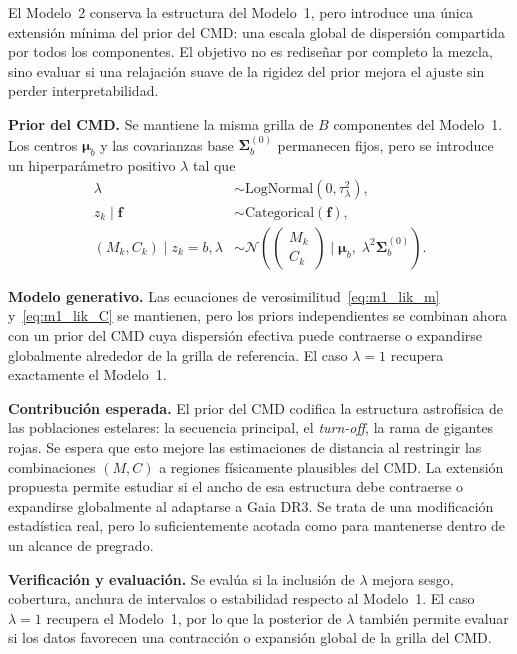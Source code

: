 \documentclass[stu, 12pt, letterpaper, donotrepeattitle, floatsintext, natbib]{apa7_ula}
\begin{document}
El Modelo~2 conserva la estructura del Modelo~1, pero introduce una
única extensión mínima del prior del CMD: una escala global de
dispersión compartida por todos los componentes. El objetivo no es
rediseñar por completo la mezcla, sino evaluar si una relajación suave
de la rigidez del prior mejora el ajuste sin perder interpretabilidad.

\textbf{Prior del CMD.}
Se mantiene la misma grilla de $B$ componentes del Modelo~1. Los
centros $\boldsymbol{\mu}_b$ y las covarianzas base
$\boldsymbol{\Sigma}^{(0)}_b$ permanecen fijos, pero se introduce un
hiperparámetro positivo $\lambda$ tal que
\begin{align}
    \lambda &\sim \text{LogNormal}(0, \tau_{\lambda}^2),
        \label{eq:m2_lambda} \\
    z_k \mid \mathbf{f} &\sim \text{Categorical}(\mathbf{f}),
        \label{eq:m2_alloc} \\
    (M_k, C_k) \mid z_k=b, \lambda &\sim
        \mathcal{N}\!\left(
        \begin{pmatrix} M_k \\ C_k \end{pmatrix}
        \;\Bigg|\;
        \boldsymbol{\mu}_b,\; \lambda^2\boldsymbol{\Sigma}^{(0)}_b
        \right).
        \label{eq:m2_cmd}
\end{align}

\textbf{Modelo generativo.}
Las ecuaciones de verosimilitud~\eqref{eq:m1_lik_m}
y~\eqref{eq:m1_lik_C} se mantienen, pero los priors independientes
se combinan ahora con un prior del CMD cuya dispersión efectiva puede
contraerse o expandirse globalmente alrededor de la grilla de
referencia. El caso $\lambda = 1$ recupera exactamente el Modelo~1.

\textbf{Contribución esperada.}
El prior del CMD codifica la estructura astrofísica de las poblaciones
estelares: la secuencia principal, el \textit{turn-off}, la rama de
gigantes rojas. Se espera que esto mejore las estimaciones de distancia
al restringir las combinaciones $(M, C)$ a regiones físicamente
plausibles del CMD. La extensión propuesta permite estudiar si el ancho
de esa estructura debe contraerse o expandirse globalmente al adaptarse
a Gaia DR3. Se trata de una modificación estadística real, pero lo
suficientemente acotada como para mantenerse dentro de un alcance de
pregrado.

\textbf{Verificación y evaluación.}
Se evalúa si la inclusión de $\lambda$ mejora sesgo, cobertura,
anchura de intervalos o estabilidad respecto al Modelo~1. El caso
$\lambda=1$ recupera el Modelo~1, por lo que la posterior de $\lambda$
también permite evaluar si los datos favorecen una contracción o
expansión global de la grilla del CMD.
\end{document}
